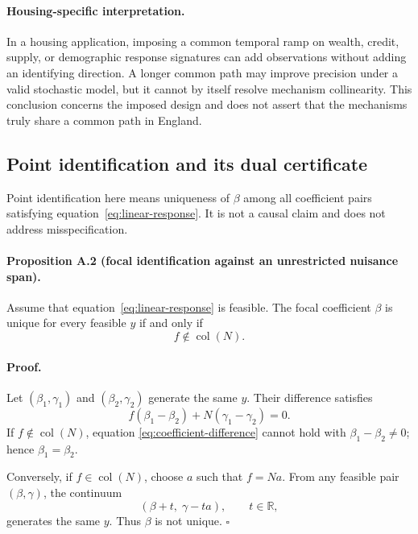\paragraph{Housing-specific interpretation.}
In a housing application, imposing a common temporal ramp on wealth, credit,
supply, or demographic response signatures can add observations without
adding an identifying direction. A longer common path may improve precision
under a valid stochastic model, but it cannot by itself resolve mechanism
collinearity. This conclusion concerns the imposed design and does not assert
that the mechanisms truly share a common path in England.

\subsection{Point identification and its dual certificate}
\label{app:point-identification}

Point identification here means uniqueness of \(\beta\) among all coefficient
pairs satisfying equation~\eqref{eq:linear-response}. It is not a causal claim
and does not address misspecification.

\paragraph{Proposition A.2 (focal identification against an unrestricted nuisance span).}
Assume that equation~\eqref{eq:linear-response} is feasible. The focal
coefficient \(\beta\) is unique for every feasible \(y\) if and only if
\begin{equation}
  f\notin\operatorname{col}(N).
  \label{eq:outside-span}
\end{equation}

\paragraph{Proof.}
Let \((\beta_1,\gamma_1)\) and \((\beta_2,\gamma_2)\) generate the same \(y\).
Their difference satisfies
\begin{equation}
  f(\beta_1-\beta_2)+N(\gamma_1-\gamma_2)=0.
  \label{eq:coefficient-difference}
\end{equation}
If \(f\notin\operatorname{col}(N)\), equation
\eqref{eq:coefficient-difference} cannot hold with
\(\beta_1-\beta_2\neq0\); hence \(\beta_1=\beta_2\).

Conversely, if \(f\in\operatorname{col}(N)\), choose \(a\) such that
\(f=Na\). From any feasible pair \((\beta,\gamma)\), the continuum
\begin{equation}
  (\beta+t,\;\gamma-ta),\qquad t\in\mathbb R,
  \label{eq:observational-equivalence-path}
\end{equation}
generates the same \(y\). Thus \(\beta\) is not unique.
\(\square\)

